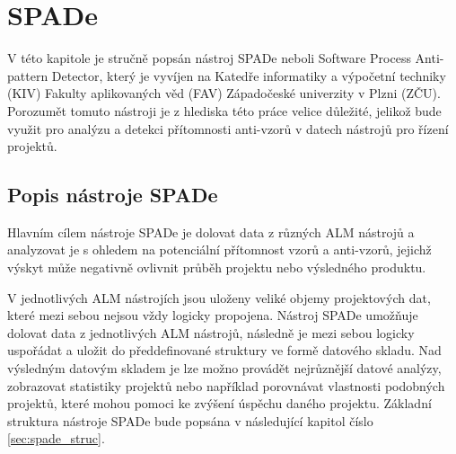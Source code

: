\documentclass[czech,DP]{thesiskiv}
\begin{document}
\chapter{SPADe}\label{sec:spade}
V této kapitole je stručně popsán nástroj SPADe neboli Software Process Anti-pattern Detector, který je vyvíjen na Katedře informatiky a výpočetní techniky (KIV) Fakulty aplikovaných věd (FAV) Západočeské univerzity v Plzni (ZČU). Porozumět tomuto nástroji je z hlediska této práce velice důležité, jelikož bude využit pro analýzu a detekci přítomnosti anti-vzorů v datech nástrojů pro řízení projektů.
\section{Popis nástroje SPADe}
Hlavním cílem nástroje SPADe je dolovat data z různých ALM nástrojů a analyzovat je s ohledem na potenciální přítomnost vzorů a anti-vzorů, jejichž výskyt může negativně ovlivnit průběh projektu nebo výsledného produktu.
\par
V jednotlivých ALM nástrojích jsou uloženy veliké objemy projektových dat, které mezi sebou nejsou vždy logicky propojena. Nástroj SPADe umožňuje dolovat data z jednotlivých ALM nástrojů, následně je mezi sebou logicky uspořádat a uložit do předdefinované struktury ve formě datového skladu. Nad výsledným datovým skladem je lze možno provádět nejrůznější datové analýzy, zobrazovat statistiky projektů nebo například porovnávat vlastnosti podobných projektů, které mohou pomoci ke zvýšení úspěchu daného projektu. Základní struktura nástroje SPADe bude popsána v následující kapitol číslo \ref{sec:spade_struc}.\cite{picha}
\end{document}
